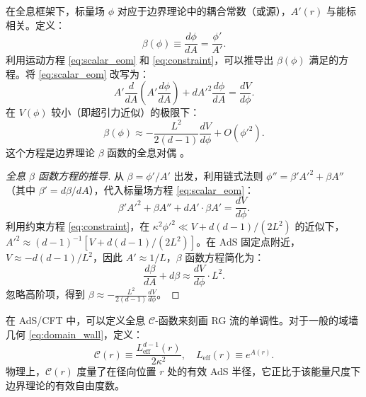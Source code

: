 \begin{proposition}\label{prop:holo_beta}
在全息框架下，标量场 $\phi$ 对应于边界理论中的耦合常数（或源），$A'(r)$ 与能标相关。定义：
\begin{equation}\label{eq:holo_beta}
    \beta(\phi) \equiv \frac{d\phi}{dA} = \frac{\phi'}{A'}.
\end{equation}
利用运动方程 \eqref{eq:scalar_eom} 和 \eqref{eq:constraint}，可以推导出 $\beta(\phi)$ 满足的方程。将 \eqref{eq:scalar_eom} 改写为：
\begin{equation}
    A'\frac{d}{dA}\left(A'\frac{d\phi}{dA}\right) + dA'^2\frac{d\phi}{dA} = \frac{dV}{d\phi}.
\end{equation}
在 $V(\phi)$ 较小（即超引力近似）的极限下：
\begin{equation}
    \beta(\phi) \approx -\frac{L^2}{2(d-1)}\frac{dV}{d\phi} + O(\phi'^2).
\end{equation}
这个方程是边界理论 $\beta$ 函数的全息对偶 \cite{Freedman1999gp}。
\end{proposition}

\begin{proof}[全息 $\beta$ 函数方程的推导]
从 $\beta = \phi'/A'$ 出发，利用链式法则 $\phi'' = \beta'A'^2 + \beta A''$（其中 $\beta' = d\beta/dA$），代入标量场方程 \eqref{eq:scalar_eom}：
\begin{equation}
    \beta'A'^2 + \beta A'' + dA'\cdot\beta A' = \frac{dV}{d\phi}.
\end{equation}
利用约束方程 \eqref{eq:constraint}，在 $\kappa^2 \phi'^2 \ll V + d(d-1)/(2L^2)$ 的近似下，$A'^2 \approx (d-1)^{-1}\left[V + d(d-1)/(2L^2)\right]$。在 AdS 固定点附近，$V \approx -d(d-1)/L^2$，因此 $A' \approx 1/L$，$\beta$ 函数方程简化为：
\begin{equation}
    \frac{d\beta}{dA} + d\beta \approx \frac{dV}{d\phi} \cdot L^2.
\end{equation}
忽略高阶项，得到 $\beta \approx -\frac{L^2}{2(d-1)}\frac{dV}{d\phi}$。
\end{proof}

\begin{definition}[全息 $\mathcal{C}$-函数]\label{def:holo_c_function}
在 AdS/CFT 中，可以定义全息 $\mathcal{C}$-函数来刻画 RG 流的单调性。对于一般的域墙几何 \eqref{eq:domain_wall}，定义：
\begin{equation}\label{eq:holo_c}
    \mathcal{C}(r) \equiv \frac{L_{\text{eff}}^{d-1}(r)}{2\kappa^2},
    \quad L_{\text{eff}}(r) \equiv e^{A(r)}.
\end{equation}
物理上，$\mathcal{C}(r)$ 度量了在径向位置 $r$ 处的有效 AdS 半径，它正比于该能量尺度下边界理论的有效自由度数。
\end{definition}


